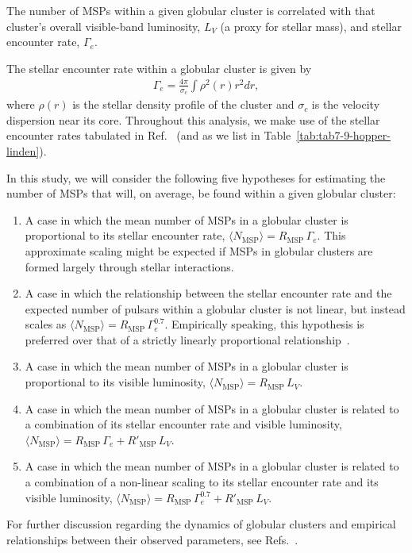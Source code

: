 \documentclass[a4paper,11pt]{article}
\begin{document}
The number of MSPs within a given globular cluster is correlated with that cluster's overall visible-band luminosity, $L_V$ (a proxy for stellar mass), and stellar encounter rate, $\Gamma_e$. 

\noindent
The stellar encounter rate within a globular cluster is given by~\cite{2003ASPC..296..245V,1987IAUS..125..187V}
%
\begin{align}
\Gamma_e = \frac{4\pi}{\sigma_c} \int \rho^2(r) r^2 dr,
\end{align}
%
where $\rho(r)$ is the stellar density profile of the cluster and $\sigma_c$ is the velocity dispersion near its core. Throughout this analysis, we make use of the stellar encounter rates tabulated in Ref.~\cite{Bahramian:2013ihw} (and as we list in Table~\ref{tab:tab7-9-hopper-linden}).

In this study, we will consider the following five hypotheses for estimating the number of MSPs that will, on average, be found within a given globular cluster:
%
\begin{enumerate}
    \item {A case in which the mean number of MSPs in a globular cluster is proportional to its stellar encounter rate, $\langle N_\textrm{MSP} \rangle = R_\textrm{MSP} \, \Gamma_e$. This approximate scaling might be expected if MSPs in globular clusters are formed largely through stellar interactions.}
    \item{A case in which the relationship between the stellar encounter rate and the expected number of pulsars within a globular cluster is not linear, but instead scales as $\langle N_\textrm{MSP} \rangle = R_\textrm{MSP} \, \Gamma_e^{0.7}$. Empirically speaking, this hypothesis is preferred over that of a strictly linearly proportional relationship~\cite{deMenezes:2018ilq,Feng:2023htd}.}
    \item{A case in which the mean number of MSPs in a globular cluster is proportional to its visible luminosity, $\langle N_\textrm{MSP} \rangle = R_\textrm{MSP}\, L_V$.}
    \item{A case in which the mean number of MSPs in a globular cluster is related to a combination of its stellar encounter rate and visible luminosity, $\langle N_\textrm{MSP} \rangle = R_\textrm{MSP} \, \Gamma_e+ R'_\textrm{MSP} \, L_V$.}
    \item{A case in which the mean number of MSPs in a globular cluster is related to a combination of a non-linear scaling to its stellar encounter rate and its visible luminosity, $\langle N_\textrm{MSP} \rangle = R_\textrm{MSP} \, \Gamma_e^{0.7}+ R'_\textrm{MSP} \, L_V$.}
\end{enumerate}
%
For further discussion regarding the dynamics of globular clusters and empirical relationships between their observed parameters, see Refs.~\cite{Feng:2023htd,Ye:2022yxt,deMenezes:2018ilq,Fragione:2018jxd}.
\end{document}
